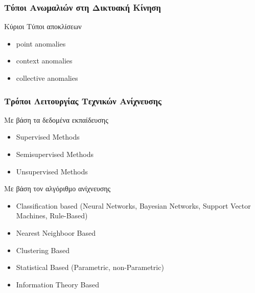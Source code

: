 \documentclass[handouts,hyperref={pdfpagelabels=false}]{beamer}
\begin{document}
\begin{frame}
\frametitle{\foreignlanguage{greek}{Τύποι Ανωμαλιών στη Δικτυακή Κίνηση}}
\begin{block}{Κύριοι Τύποι αποκλίσεων}
\begin{itemize}
    \item \textlatin{point anomalies}
    \item \textlatin{context anomalies}
    \item \textlatin{collective anomalies}
\end{itemize}
\end{block}
\end{frame}

\begin{frame}
\frametitle{\foreignlanguage{greek}{Τρόποι Λειτουργίας Τεχνικών Ανίχνευσης}}
\begin{block}{Με βάση τα δεδομένα εκπαίδευσης}
\begin{itemize}
    \item \textlatin{Supervised Methods}
    \item \textlatin{Semisupervised Methods}
    \item \textlatin{Unsupervised Methods}
\end{itemize}
\end{block}

\begin{block}{Με βάση τον αλγόριθμο ανίχνευσης}
\begin{itemize}
    \item \textlatin{Classification based (Neural Networks, Bayesian Networks, Support Vector Machines, Rule-Based)}
    \item \textlatin{Nearest Neighboor Based}
    \item \textlatin{Clustering Based}
    \item \textlatin{Statistical Based (Parametric, non-Parametric)}
    \item \textlatin{Information Theory Based}
\end{itemize}
\end{block}
\end{frame}
\end{document}
